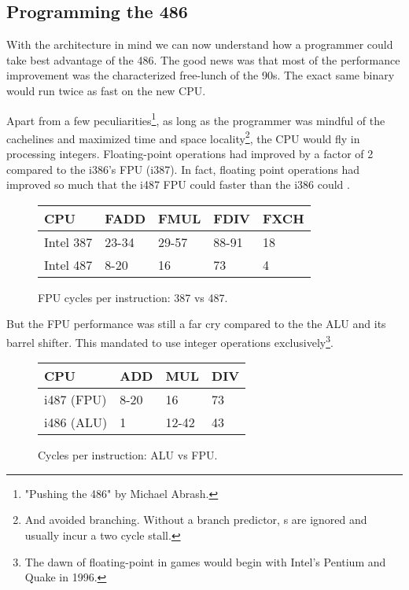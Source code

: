 \subsection{Programming the 486}
With the architecture in mind we can now understand how a programmer could take best advantage of the 486. The good news was that most of the performance improvement was the characterized free-lunch of the 90s. The exact same binary would run twice as fast on the new CPU.\\
\par
Apart from a few peculiarities\footnote{"Pushing the 486" by Michael Abrash.}, as long as the programmer was mindful of the cachelines and maximized time and space locality\footnote{And avoided branching. Without a branch predictor, s are ignored and usually incur a two cycle stall.}, the CPU would fly in processing integers. Floating-point operations had improved by a factor of 2 compared to the i386's FPU (i387). In fact, floating point operations had improved so much that the i487 FPU could  faster than the i386 could .\\
\par
\begin{figure}[H]
\centering
\begin{tabularx}{\textwidth}{ X  X X  X  X}
  \toprule
  \textbf{CPU} & \textbf{FADD} & \textbf{FMUL} & \textbf{FDIV} &\textbf{FXCH} \\
  \toprule
Intel 387 & 23-34 & 29-57   & 88-91 & 18 \\
Intel 487 & 8-20  & 16   & 73 & 4 \\ \bottomrule
\end{tabularx}
\caption{FPU cycles per instruction: 387 vs 487.}

\end{figure}

\par
But the FPU performance was still a far cry compared to the the ALU and its barrel shifter. This mandated \doom{} to use integer operations exclusively\footnote{The dawn of floating-point in games would begin with Intel's Pentium and Quake in 1996.}.\\

\par
 \begin{figure}[H]
\centering  
\begin{tabularx}{\textwidth}{ L{0.25} L{0.25} L{0.25} L{0.25} }
  \toprule
  \textbf{CPU} &  \textbf{ADD}  & \textbf{MUL} & \textbf{DIV}\\
  \toprule 
   i487 (FPU) & 8-20  & 16 & 73\\
   i486 (ALU) & 1  & 12-42 & 43\\
   \toprule
\end{tabularx}
\caption{Cycles per instruction: ALU vs FPU.}
\end{figure}

